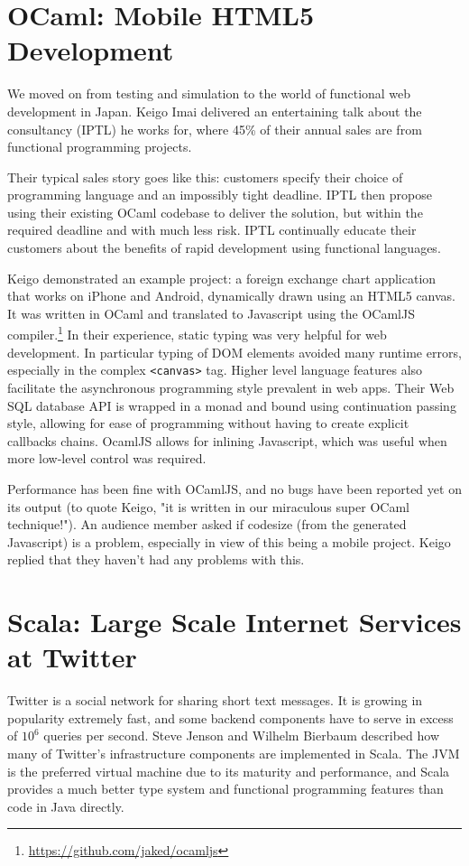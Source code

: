 \documentclass{jfp1}
\begin{document}
\section{OCaml: Mobile HTML5 Development}

We moved on from testing and simulation to the world of functional web
development in Japan. Keigo Imai delivered an entertaining talk about
the consultancy (IPTL) he works for, where 45\% of their annual sales
are from functional programming projects.

Their typical sales story goes like this: customers specify their
choice of programming language and an impossibly tight deadline.  IPTL
then propose using their existing OCaml codebase to deliver the
solution, but within the required deadline and with much less risk.
IPTL continually educate their customers about the benefits of rapid
development using functional languages.

Keigo demonstrated an example project: a foreign exchange chart
application that works on iPhone and Android, dynamically drawn using
an HTML5 canvas.  It was written in OCaml and translated to Javascript using the OCamlJS compiler.\footnote{\url{https://github.com/jaked/ocamljs}}  In their experience,
static typing was very helpful for web development.  In particular typing of
DOM elements avoided many runtime errors, especially in the complex
{\tt <canvas>} tag.  Higher level language features also facilitate the
asynchronous programming style prevalent in web apps.  Their Web SQL
database API is wrapped in a monad and bound using continuation
passing style, allowing for ease of programming without having to
create explicit callbacks chains.  OcamlJS allows for inlining
Javascript, which was useful when more low-level control was required.

Performance has been fine with OCamlJS, and no bugs have been reported
yet on its output (to quote Keigo, "it is written in our miraculous
super OCaml technique!"). An audience member asked if codesize (from the generated Javascript)
is a problem, especially in view of this being a mobile project.
Keigo replied that they haven't had any problems with this.

\section{Scala: Large Scale Internet Services at Twitter}

Twitter is a social network for sharing short text messages. It is
growing in popularity extremely fast, and some backend components have
to serve in excess of $10^6$ queries per second.
Steve Jenson and Wilhelm Bierbaum described how many of Twitter's infrastructure
components are implemented in Scala.  The JVM is the preferred virtual
machine due to its maturity and performance, and Scala provides a much
better type system and functional programming features than code in Java
directly.
\end{document}
